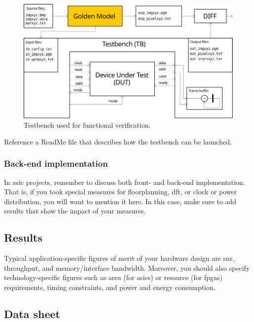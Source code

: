       \begin{figure}
        \centering
        \includegraphics[width=\textwidth]{fig/functional_verification_tb}
        \caption{Testbench used for functional verification.}%
        \label{fig:functional_verification_tb}
      \end{figure}

      Reference a ReadMe file that describes how the testbench can be launched.

    \subsubsection{Back-end implementation}

      In \gls{asic} projects, remember to discuss both front- and back-end implementation.
      That is, if you took special measures for floorplanning, \gls{dft}, or clock or power distribution, you will want to mention it here.
      In this case, make sure to add results that show the impact of your measures.

  \subsection{Results}

    Typical application-specific figures of merit of your hardware design are \gls{snr}, throughput, and memory/interface bandwidth.
    Moreover, you should also specify technology-specific figures such as area (for \glspl{asic}) or resource (for \glspl{fpga}) requirements, timing constraints, and power and energy consumption.

  \subsection{Data sheet}

